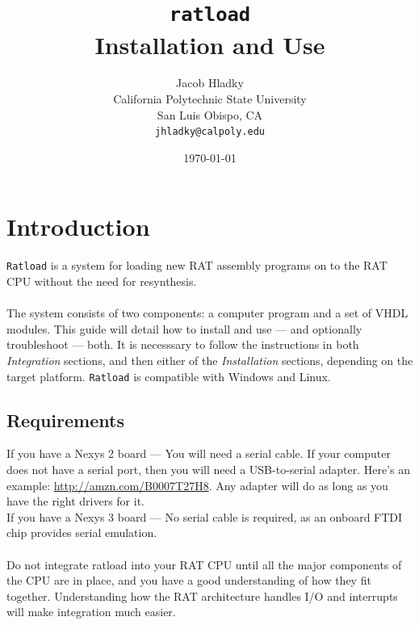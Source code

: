 \documentclass[notitlepage]{article}
\makeatletter
\newcommand*{\toccontents}{\@starttoc{toc}}
\makeatother
\begin{document}
\title{\huge{\texttt{ratload}\\ Installation and Use}}
\author{
  Jacob Hladky\\
  California Polytechnic State University\\
  San Luis Obispo, CA\\
  \texttt{jhladky@calpoly.edu}
}
\date{\today}
\maketitle

\toccontents


\section{Introduction}
\texttt{Ratload} is a system for loading new RAT assembly programs on to the RAT CPU without the need for resynthesis.\\\\
The system consists of two components: a computer program and a set of VHDL modules. This guide will detail how to install and use --- and optionally troubleshoot --- both. It is necesssary to follow the instructions in both \emph{Integration} sections, and then either of the \emph{Installation} sections, depending on the target platform. \texttt{Ratload} is compatible with Windows and Linux.

\subsection{Requirements}
If you have a Nexys 2 board --- You will need a serial cable. If your computer does not have a serial port, then you will need a USB-to-serial adapter. Here's an example: \url{http://amzn.com/B0007T27H8}. Any adapter will do as long as you have the right drivers for it.\\
If you have a Nexys 3 board --- No serial cable is required, as an onboard FTDI chip provides serial emulation.\\\\
Do not integrate ratload into your RAT CPU until all the major components of the CPU are in place, and you have a good understanding of how they fit together. Understanding how the RAT architecture handles I/O and interrupts will make integration much easier.
\end{document}
